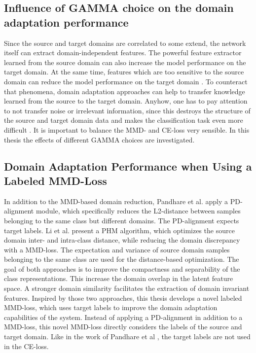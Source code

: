 \subsection{Influence of GAMMA choice on the domain adaptation performance}
Since the source and target domains are correlated to some extend, the network itself can extract domain-independent features. The powerful feature extractor learned from the source domain can also increase the model performance on the target domain. At the same time, features which are too sensitive to the source domain can reduce the model performance on the target domain \cite{li2020}. To counteract that phenomena, domain adaptation approaches can help to transfer knowledge learned from the source to the target domain. Anyhow, one has to pay attention to not transfer noise or irrelevant information, since this destroys the structure of the source and target domain data and makes the classification task even more difficult \cite{li2020}. It is important to balance the MMD- and CE-loss very sensible. In this thesis the effects of different GAMMA choices are investigated.

\subsection{Domain Adaptation Performance when Using a Labeled MMD-Loss}
In addition to the MMD-based domain reduction, Pandhare et al. \cite{Pandhare2021} apply a PD-alignment module, which specifically reduces the L2-distance between samples belonging to the same class but different domains. The PD-alignment expects target labels. Li et al. \cite{Li2018} present a PHM algorithm, which optimizes the source domain inter- and intra-class distance, while reducing the domain discrepancy with a MMD-loss. The expectation and variance of source domain samples belonging to the same class are used for the distance-based optimization. The goal of both approaches is to improve the compactness and separability of the class representations. This increase the domain overlap in the latent feature space. A stronger domain similarity facilitates the extraction of domain invariant features. Inspired by those two approaches, this thesis develops a novel labeled MMD-loss, which uses target labels to improve the domain adaptation capabilities of the system. Instead of applying a PD-alignment in addition to a MMD-loss, this novel MMD-loss directly considers the labels of the source and target domain. Like in the work of Pandhare et al \cite{Pandhare2021}, the target labels are not used in the CE-loss.


